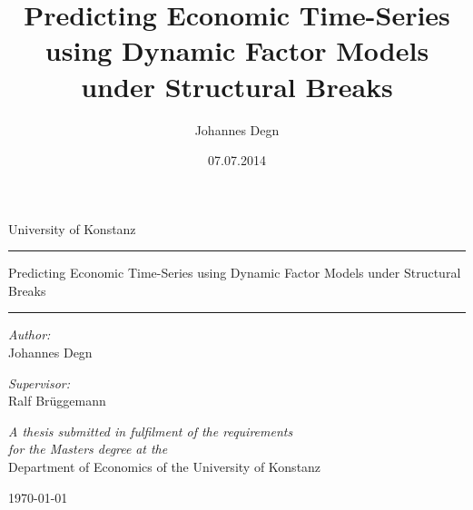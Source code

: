 \documentclass[12pt]{article}
\title{\textbf{Predicting Economic Time-Series using Dynamic Factor Models under Structural Breaks}}
\author{Johannes Degn}
\date{07.07.2014}
\newcommand{\HRule}{\rule{\linewidth}{0.5mm}}
\begin{document}
\titlepage
\thispagestyle{empty}
\setcounter{page}{0}

\begin{titlepage}
\begin{center}
	University of Konstanz

	\vspace{2cm}
	\HRule
	\vspace{1cm}
	\large{Predicting Economic Time-Series using Dynamic Factor Models under Structural Breaks}
	\vspace{1cm}
	\HRule
    \vspace{1cm}
    
	\begin{minipage}{0.4\textwidth}
		\begin{flushleft}
			\emph{Author:} \\
			Johannes Degn
		\end{flushleft}
	\end{minipage}
	\begin{minipage}{0.4\textwidth}
		\begin{flushright}
			\emph{Supervisor:} \\
			Ralf Brüggemann
		\end{flushright}
	\end{minipage}
    \vspace{8cm}
	 
	\textit{A thesis submitted in fulfilment of the requirements\\ for the Masters degree}
	\textit{at the}\\[0.4cm]
	Department of Economics of the University of Konstanz
	 
	{\large \today}\\[4cm]
	 
	\vfill


\end{center}
\end{titlepage}



\newpage







\newpage
\tableofcontents
\newpage

\cleardoublepage
{}
\listoffigures
\cleardoublepage
{}
\listoftables
\newpage



\end{document}
